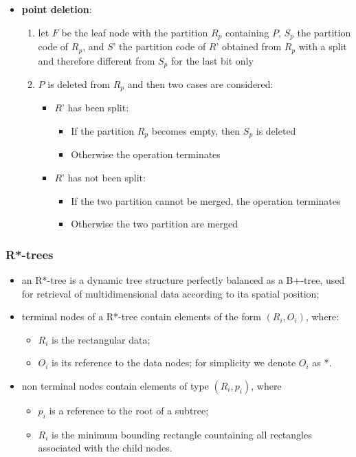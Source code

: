 \begin{itemize}
    \item \textbf{point deletion}:
    \begin{enumerate}
        \item let $F$ be the leaf node with the partition $R_p$ containing $P$, $S_p$ the partition code of $R_p$, and $S$' the partition code of $R$' obtained from $R_p$ with a split and therefore different from $S_p$ for the last bit only
        \item $P$ is deleted from $R_p$ and then two cases are considered:
        \begin{itemize}
            \item $R$' has been split:
            \begin{itemize}
                \item If the partition $R_p$ becomes empty, then $S_p$ is deleted
                \item Otherwise the operation terminates
            \end{itemize}
            \item $R$' has not been split:
            \begin{itemize}
                \item If the two partition cannot be merged, the operation terminates
                \item Otherwise the two partition are merged
            \end{itemize}
        \end{itemize} 
    \end{enumerate}
\end{itemize}

\subsubsection{R*-trees}
\begin{itemize}
    \item an R*-tree is a dynamic tree structure perfectly balanced as a B+-tree, used for retrieval of multidimensional data according to ita spatial position;
    \item terminal nodes of a R*-tree contain elements of the form $(R_i, O_i)$, where:
    \begin{itemize}
        \item $R_i$ is the rectangular data;
        \item $O_i$ is its reference to the data nodes; for simplicity we denote $O_i$ as *.
    \end{itemize}  
    \item non terminal nodes contain elements of type $(R_i, p_i)$, where 
    \begin{itemize}
        \item $p_i$ is a reference to the root of a subtree;
        \item $R_i$ is the minimum bounding rectangle countaining all rectangles associated with the child nodes.
    \end{itemize}
\end{itemize}

